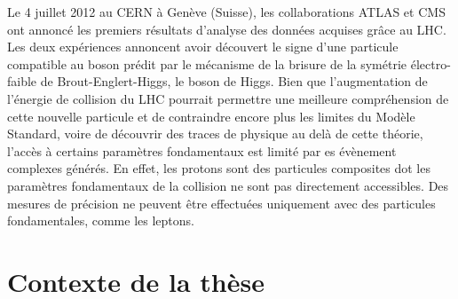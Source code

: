 \documentclass[a4papper, 10pt]{article}
\title{\textbf{Intelligent detection layers for advanced tracking in high-energy physics} \\ \large \vskip 1ex
        Résumé de la thèse de doctorat}
\author{Benjamin Boitrelle \\ 
        Sous la direction de : \\
        Jérôme Baudot : Directeur de thèse à l'Université de Strasbourg \\
        Ingrid Maria Gregor : Encadrante au laboratoire d'accueil au DESY de Hambourg}
\date{}
\begin{document}
    \maketitle


Le 4 juillet 2012 au CERN à Genève (Suisse), les collaborations ATLAS et CMS ont annoncé les premiers résultats d'analyse des données acquises grâce au LHC. 
Les deux expériences annoncent avoir découvert le signe d'une particule compatible au boson prédit par le mécanisme de la brisure de la symétrie électro-faible de Brout-Englert-Higgs, le boson de Higgs.
Bien que l'augmentation de l'énergie de collision du LHC pourrait permettre une meilleure compréhension de cette nouvelle particule et de contraindre encore plus les limites du Modèle Standard, voire de découvrir des traces de physique au delà de cette théorie, l'accès à certains paramètres fondamentaux est limité par es évènement complexes générés.
En effet, les protons sont des particules composites dot les paramètres fondamentaux de la collision ne sont pas directement accessibles.
Des mesures de précision ne peuvent être effectuées uniquement avec des particules fondamentales, comme les leptons.         


    \section{Contexte de la thèse}


\end{document}
